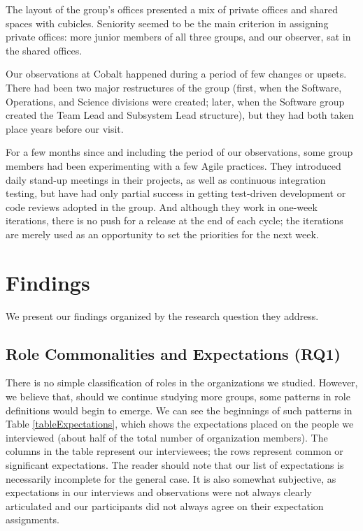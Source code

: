 \documentclass[10pt, conference, compsocconf]{IEEEtran}
\begin{document}
The layout of the group's offices presented a mix of private offices and shared spaces with cubicles. Seniority seemed to be the main criterion in assigning private offices: more junior members of all three groups, and our observer, sat in the shared offices.

Our observations at Cobalt happened during a period of few changes or upsets. There had been two major restructures of the group (first, when the Software, Operations, and Science divisions were created; later, when the Software group created the Team Lead and Subsystem Lead structure), but they had both taken place years before our visit.

For a few months since and including the period of our observations, some group members had been experimenting with a few Agile practices. They introduced daily stand-up meetings in their projects, as well as continuous integration testing, but have had only partial success in getting test-driven development or code reviews adopted in the group. And although they work in one-week iterations, there is no push for a release at the end of each cycle; the iterations are merely used as an opportunity to set the priorities for the next week.




\section{Findings}

We present our findings organized by the research question they address.




\subsection{Role Commonalities and Expectations (RQ1)}

There is no simple classification of roles in the organizations we studied. However, we believe that, should we continue studying more groups, some patterns in role definitions would begin to emerge. We can see the beginnings of such patterns in Table \ref{tableExpectations}, which shows the expectations placed on the people we interviewed (about half of the total number of organization members). The columns in the table represent our interviewees; the rows represent common or significant expectations. The reader should note that our list of expectations is necessarily incomplete for the general case. It is also somewhat subjective, as expectations in our interviews and observations were not always clearly articulated and our participants did not always agree on their expectation assignments.
\end{document}
